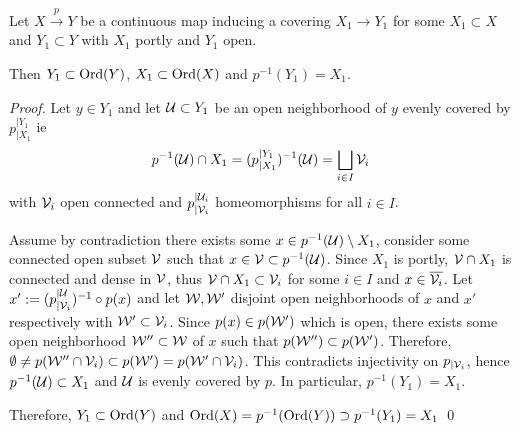 \begin{lem}\label{lem:spread_partial_covering} Let $X\xrightarrow{p} Y$ be a continuous map inducing a covering $X_1\rightarrow Y_1$ for some $X_1\subset X$ and $Y_1\subset Y$ with $X_1$ portly and $Y_1$ open. 
 
 Then $Y_1\subset \mathrm{Ord}(Y)$, $X_1 \subset \mathrm{Ord}(X)$ and $p^{-1}(Y_1)=X_1$. 
\end{lem}



\begin{proof}
 Let $y\in Y_1$ and let $\mathcal{U}\subset Y_1$ be an open neighborhood 
 of $y$ evenly covered by $p_{|X_1}^{|Y_1}$ ie
 $$p^{-1}(\mathcal{U})\cap X_1 = (p_{|X_1}^{|Y_1})^{-1}(\mathcal{U})=\bigsqcup_{i\in I} \mathcal V_i$$
 with $\mathcal V_i$ open connected and $p_{|\mathcal V_i}^{|\mathcal{U}_i}$ homeomorphisms for all $i\in I$. 
 
 Assume by contradiction there exists some $x\in p^{-1}(\mathcal{U})\setminus X_1$, consider some connected open subset  $\mathcal V$ such that $x\in \mathcal V\subset p^{-1}(\mathcal{U})$. Since $X_1$ is portly, $\mathcal V\cap X_1$ is connected and dense in $\mathcal V$, thus  $\mathcal V\cap X_1 \subset \mathcal V_i$ for some $i\in I$ and $x\in \overline{\mathcal V_i}$. Let $x':= (p_{|\mathcal V_i}^{|\mathcal{U}})^{-1}\circ p(x)$ and let $\mathcal W,\mathcal W'$ disjoint open neighborhoods of $x$ and $x'$ respectively with $\mathcal W'\subset \mathcal V_i$. Since $p(x) \in p(\mathcal W')$ which is open, there exists some open neighborhood $\mathcal W''\subset \mathcal W$  of $x$ such that $p(\mathcal W'')\subset p(\mathcal W')$. Therefore, $\emptyset \neq p(\mathcal W''\cap \mathcal V_i) \subset p(\mathcal W')=p(\mathcal W'\cap \mathcal V_i)$. This contradicts injectivity on $p_{|\mathcal V_i}$, hence $p^{-1}(\mathcal{U})\subset X_1$ and $\mathcal{U}$ is evenly covered by $p$. In particular, $p^{-1}(Y_1) = X_1$.
 
 Therefore, $Y_1\subset \mathrm{Ord}(Y)$ and $\mathrm{Ord}(X) = p^{-1}(\mathrm{Ord}(Y)) \supset p^{-1}(Y_1) = X_1$
\qed\end{proof}

